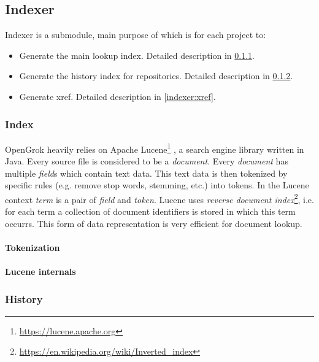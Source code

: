 \subsection{Indexer}
\label{indexer}

Indexer is a submodule, main purpose of which is for each project to:
\begin{itemize}
    \item Generate the main lookup index. Detailed description in \ref{indexer:index}.
    \item Generate the history index for repositories. Detailed description in \ref{indexer:history}.
    \item Generate xref. Detailed description in \ref{indexer:xref}.
\end{itemize}

\subsubsection{Index}
\label{indexer:index}

OpenGrok heavily relies on Apache Lucene\footnote{\url{https://lucene.apache.org}} \citep{lucene_in_action}, a search engine library
written in Java. Every source file is considered to be a \textit{document}. Every \textit{document} has multiple
\textit{field}s which contain text data. This text data is then tokenized by specific rules (e.g. remove stop words,
stemming, etc.) into tokens. In the Lucene context \textit{term} is a pair of \textit{field} and \textit{token}.
Lucene uses \textit{reverse document index}\footnote{\url{https://en.wikipedia.org/wiki/Inverted_index}},
i.e. for each term a collection of document identifiers is stored in which this term occurrs.
This form of data representation is very efficient for document lookup.

\paragraph{Tokenization}

\paragraph{Lucene internals}

\subsubsection{History}
\label{indexer:history}

